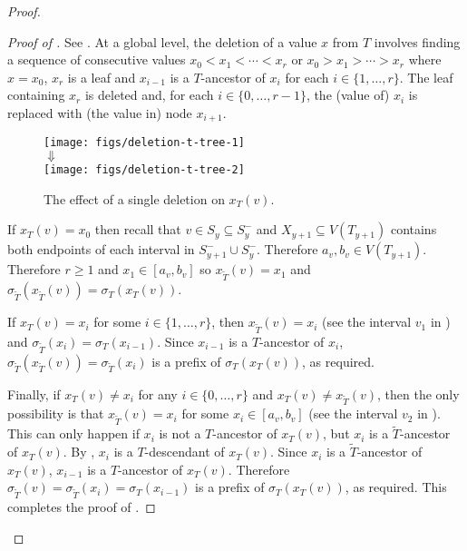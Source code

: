 \documentclass[kpfonts]{patmorin}
\let\ge\geqslant
\begin{document}
\begin{proof}
  \begin{proof}[Proof of ]
    See .  At a global level, the deletion of a value $x$ from $T$ involves finding a sequence of consecutive values $x_0<x_1<\cdots<x_r$ or $x_0>x_1>\cdots>x_r$ where $x=x_0$, $x_r$ is a leaf and $x_{i-1}$ is a $T$-ancestor of $x_{i}$ for each $i\in\{1,\ldots,r\}$.  The leaf containing $x_r$ is deleted and, for each $i\in\{0,\ldots,r-1\}$, the (value of) $x_i$ is replaced with (the value in) node $x_{i+1}$.

    \begin{figure}
      \begin{center}
        \texttt{[image: figs/deletion-t-tree-1]}\\[1ex]
        $\Downarrow$\\[1ex]
        \texttt{[image: figs/deletion-t-tree-2]}
      \end{center}
      \caption{The effect of a single deletion on $x_T(v)$.}
    \end{figure}

    If $x_T(v)=x_0$ then recall that $v\in S_y\subseteq S^-_y$ and $X_{y+1}\subseteq V(T_{y+1})$ contains both endpoints of each interval in $S^-_{y+1}\cup S^-_y$.  Therefore $a_v,b_v\in V(T_{y+1})$.  Therefore $r\ge 1$ and $x_1\in [a_v,b_v]$ so $x_{\tilde{T}}(v)=x_1$ and $\sigma_{\tilde{T}}(x_{\tilde{T}}(v))=\sigma_T(x_T(v))$.

    If $x_T(v)=x_i$ for some $i\in\{1,\ldots,r\}$, then $x_{\tilde{T}}(v)=x_i$ (see the interval $v_1$ in ) and $\sigma_{\tilde{T}}(x_i)=\sigma_{T}(x_{i-1})$.  Since $x_{i-1}$ is a $T$-ancestor of $x_i$, $\sigma_{\tilde{T}}(x_{\tilde{T}}(v))=\sigma_{\tilde{T}}(x_i)$ is a prefix of $\sigma_{T}(x_{T}(v))$, as required.

    Finally, if $x_T(v)\neq x_i$ for any $i\in\{0,\ldots,r\}$ and $x_T(v)\neq x_{\tilde{T}}(v)$, then the only possibility is that $x_{\tilde{T}}(v)=x_i$ for some $x_i\in [a_v,b_v]$ (see the interval $v_2$ in ).  This can only happen if $x_i$ is not a $T$-ancestor of $x_T(v)$, but $x_i$ is a $\tilde{T}$-ancestor of $x_T(v)$.  By , $x_i$ is a $T$-descendant of $x_T(v)$.  Since $x_i$ is a $\tilde{T}$-ancestor of $x_T(v)$, $x_{i-1}$ is a $T$-ancestor of $x_T(v)$.  Therefore $\sigma_{\tilde{T}}(v)=\sigma_{\tilde{T}}(x_i)=\sigma_T(x_{i-1})$ is a prefix of $\sigma_T(x_T(v))$, as required.  This completes the proof of .
  \end{proof}


\end{proof}
\end{document}
